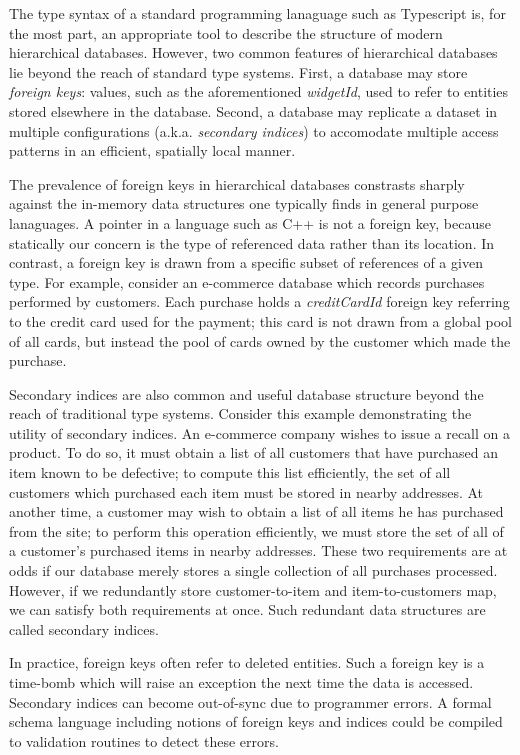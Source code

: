 \documentclass[sigplan,10pt,review,anonymous]{acmart}
\begin{document}
The type syntax of a standard programming lanaguage such as Typescript is, for the most part, an appropriate tool to describe the structure of modern hierarchical databases. However, two common features of hierarchical databases lie beyond the reach of standard type systems. First, a database may store \emph{foreign keys}: values, such as the aforementioned \emph{widgetId}, used to refer to entities stored elsewhere in the database. Second, a database may replicate a dataset in multiple configurations (a.k.a. \emph{secondary indices}) to accomodate multiple access patterns in an efficient, spatially local manner. 

The prevalence of foreign keys in hierarchical databases constrasts sharply against the in-memory data structures one typically finds in general purpose lanaguages. A pointer in a language such as C++ is not a foreign key, because statically our concern is the type of referenced data rather than its location. In contrast, a foreign key is drawn from a specific subset of references of a given type. For example, consider an e-commerce database which records purchases performed by customers. Each purchase holds a \emph{creditCardId} foreign key referring to the credit card used for the payment; this card is not drawn from a global pool of all cards, but instead the pool of cards owned by the customer which made the purchase. 

Secondary indices are also common and useful database structure beyond the reach of traditional type systems. Consider this example demonstrating the utility of secondary indices. An e-commerce company wishes to issue a recall on a product. To do so, it must obtain a list of all customers that have purchased an item known to be defective; to compute this list efficiently, the set of all customers which purchased each item must be stored in nearby addresses. At another time, a customer may wish to obtain a list of all items he has purchased from the site; to perform this operation efficiently, we must store the set of all of a customer's purchased items in nearby addresses. These two requirements are at odds if our database merely stores a single collection of all purchases processed. However, if we redundantly store customer-to-item and item-to-customers map, we can satisfy both requirements at once. Such redundant data structures are called secondary indices.

In practice, foreign keys often refer to deleted entities. Such a foreign key is a time-bomb which will raise an exception the next time the data is accessed. Secondary indices can become out-of-sync due to programmer errors. A formal schema language including notions of foreign keys and indices could be compiled to validation routines to detect these errors.
\end{document}
